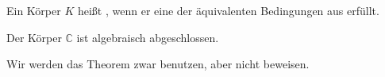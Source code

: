 \begin{definition}
	Ein Körper $K$ heißt , wenn er eine 
	der äquivalenten Bedingungen aus  erfüllt. 
\end{definition}

\begin{theorem}
	Der Körper $\mathbb C$ ist algebraisch abgeschlossen.
\end{theorem}

\begin{remark}
	Wir werden das Theorem zwar benutzen, aber nicht beweisen.
\end{remark}